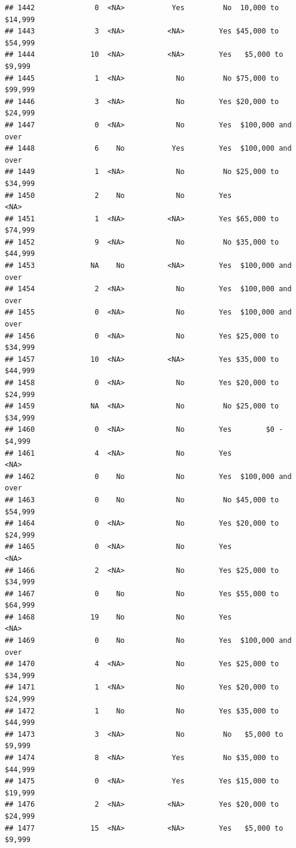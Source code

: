 \documentclass[man]{apa6}
\begin{document}
\begin{verbatim}
## 1442              0  <NA>           Yes         No  10,000 to $14,999
## 1443              3  <NA>          <NA>        Yes $45,000 to $54,999
## 1444             10  <NA>          <NA>        Yes   $5,000 to $9,999
## 1445              1  <NA>            No         No $75,000 to $99,999
## 1446              3  <NA>            No        Yes $20,000 to $24,999
## 1447              0  <NA>            No        Yes  $100,000 and over
## 1448              6    No           Yes        Yes  $100,000 and over
## 1449              1  <NA>            No         No $25,000 to $34,999
## 1450              2    No            No        Yes               <NA>
## 1451              1  <NA>          <NA>        Yes $65,000 to $74,999
## 1452              9  <NA>            No         No $35,000 to $44,999
## 1453             NA    No          <NA>        Yes  $100,000 and over
## 1454              2  <NA>            No        Yes  $100,000 and over
## 1455              0  <NA>            No        Yes  $100,000 and over
## 1456              0  <NA>            No        Yes $25,000 to $34,999
## 1457             10  <NA>          <NA>        Yes $35,000 to $44,999
## 1458              0  <NA>            No        Yes $20,000 to $24,999
## 1459             NA  <NA>            No         No $25,000 to $34,999
## 1460              0  <NA>            No        Yes        $0 - $4,999
## 1461              4  <NA>            No        Yes               <NA>
## 1462              0    No            No        Yes  $100,000 and over
## 1463              0    No            No         No $45,000 to $54,999
## 1464              0  <NA>            No        Yes $20,000 to $24,999
## 1465              0  <NA>            No        Yes               <NA>
## 1466              2  <NA>            No        Yes $25,000 to $34,999
## 1467              0    No            No        Yes $55,000 to $64,999
## 1468             19    No            No        Yes               <NA>
## 1469              0    No            No        Yes  $100,000 and over
## 1470              4  <NA>            No        Yes $25,000 to $34,999
## 1471              1  <NA>            No        Yes $20,000 to $24,999
## 1472              1    No            No        Yes $35,000 to $44,999
## 1473              3  <NA>            No         No   $5,000 to $9,999
## 1474              8  <NA>           Yes         No $35,000 to $44,999
## 1475              0  <NA>           Yes        Yes $15,000 to $19,999
## 1476              2  <NA>          <NA>        Yes $20,000 to $24,999
## 1477             15  <NA>          <NA>        Yes   $5,000 to $9,999

\end{verbatim}
\end{document}
